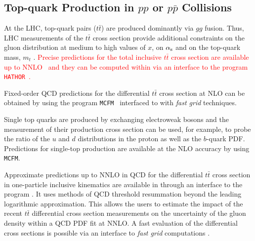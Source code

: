 


\subsection{Top-quark Production in $pp$ or $p \bar p$ Collisions}

At the LHC, top-quark pairs ($t \bar t$) are produced dominantly via $gg$ fusion.
Thus, LHC measurements of the $t \bar t$ cross section provide additional 
constraints on the gluon distribution at medium to high values of $x$, 
on $\alpha_\mathrm{s}$ and on the top-quark mass, $m_t$ \cite{cms:top}. 
\textcolor{red}{
Precise predictions for the total inclusive $t \bar t$ cross section are available 
up to NNLO~\cite{Czakon:2013goa} and they can be computed within \fitter via an interface 
to the program \texttt{HATHOR}~\cite{Aliev:2010zk}. 
}

Fixed-order QCD predictions for the differential $t \bar t$ cross section at NLO can be obtained by using
the program \texttt{MCFM}~\cite{Campbell:2010ff,Campbell:2009ss,Campbell:2005bb,Campbell:2004ch,Campbell:2012uf} 
interfaced to \fitter with \emph{fast grid} techniques.

Single top quarks are produced by exchanging electroweak bosons and the measurement of their production cross section can be used, for example, 
to probe the ratio of the $u$ and $d$ distributions in the proton 
as well as the $b$-quark PDF. Predictions 
for single-top production are available at the NLO accuracy by using \texttt{MCFM}.

Approximate predictions up to NNLO in QCD for the differential $t\bar{t}$ cross section in one-particle 
inclusive kinematics are available in \fitter through an interface to the program \difftop \cite{Guzzi:2014wia,difftop-web}.
It uses methods of QCD threshold resummation beyond the leading logarithmic approximation.
This allows the users to estimate the impact of the recent $t\bar{t}$ differential cross section measurements on the uncertainty 
of the gluon density within a QCD PDF fit at NNLO.
A fast evaluation of the \difftop differential cross sections is possible via an interface to \emph{fast grid}
computations \cite{dis2014Fast}. 

